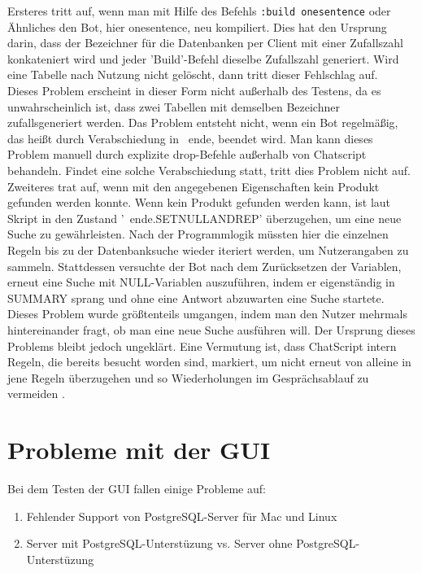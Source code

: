 Ersteres tritt auf, wenn man mit Hilfe des Befehls \lstinline|:build onesentence| oder Ähnliches den Bot, hier onesentence, neu kompiliert. Dies hat den Ursprung darin, dass der Bezeichner für die Datenbanken per Client mit einer Zufallszahl konkateniert wird und jeder 'Build'-Befehl dieselbe Zufallszahl generiert. Wird eine Tabelle nach Nutzung nicht gelöscht, dann tritt dieser Fehlschlag auf.\\
Dieses Problem erscheint in dieser Form nicht außerhalb des Testens, da es unwahrscheinlich ist, dass zwei Tabellen mit demselben Bezeichner zufallsgeneriert werden. Das Problem entsteht nicht, wenn ein Bot regelmäßig, das heißt durch Verabschiedung in ~ende, beendet wird. Man kann dieses Problem manuell durch explizite drop-Befehle außerhalb von Chatscript behandeln. Findet eine solche Verabschiedung statt, tritt dies Problem nicht auf.\\
Zweiteres trat auf, wenn mit den angegebenen Eigenschaften kein Produkt gefunden werden konnte. Wenn kein Produkt gefunden werden kann, ist laut Skript in den Zustand '~ende.SETNULLANDREP' überzugehen, um eine neue Suche zu gewährleisten. Nach der Programmlogik müssten hier die einzelnen Regeln bis zu der Datenbanksuche wieder iteriert werden, um Nutzerangaben zu sammeln. Stattdessen versuchte der Bot nach dem Zurücksetzen der Variablen, erneut eine Suche mit NULL-Variablen auszuführen, indem er eigenständig in SUMMARY sprang und ohne eine Antwort abzuwarten eine Suche startete.\\
Dieses Problem wurde größtenteils umgangen, indem man den Nutzer mehrmals hintereinander fragt, ob man eine neue Suche ausführen will. Der Ursprung dieses Problems bleibt jedoch ungeklärt. Eine Vermutung ist, dass ChatScript intern Regeln, die bereits besucht worden sind, markiert, um nicht erneut von alleine in jene Regeln überzugehen und so Wiederholungen im Gesprächsablauf zu vermeiden \cite{chatscript2019}.\\


\section{Probleme mit der GUI}
\label{sec: Probleme mit der GUI}

Bei dem Testen der GUI fallen einige Probleme auf: 

\begin{enumerate}
\item{Fehlender Support von PostgreSQL-Server für Mac und Linux}
\item{Server mit PostgreSQL-Unterstüzung vs. Server ohne PostgreSQL-Unterstüzung}
\end{enumerate}

